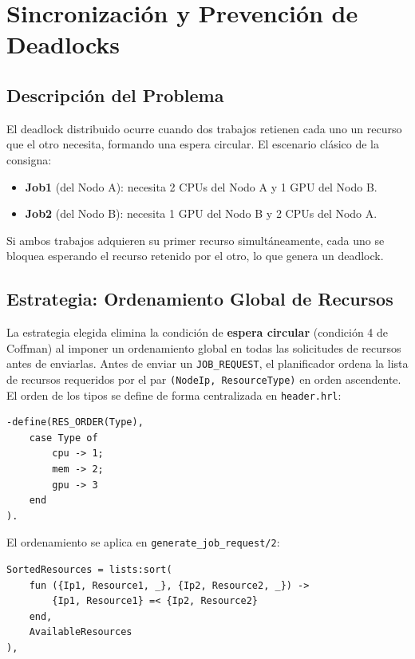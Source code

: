 \documentclass[12pt,a4paper]{article}
\begin{document}
\section{Sincronización y Prevención de Deadlocks}

\subsection{Descripción del Problema}

El deadlock distribuido ocurre cuando dos trabajos retienen cada uno un recurso que el otro necesita, formando una espera circular. El escenario clásico de la consigna:

\begin{itemize}
  \item \textbf{Job1} (del Nodo A): necesita 2 CPUs del Nodo A y 1 GPU del Nodo B.
  \item \textbf{Job2} (del Nodo B): necesita 1 GPU del Nodo B y 2 CPUs del Nodo A.
\end{itemize}

Si ambos trabajos adquieren su primer recurso simultáneamente, cada uno se bloquea esperando el recurso retenido por el otro, lo que genera un deadlock.

\subsection{Estrategia: Ordenamiento Global de Recursos}

La estrategia elegida elimina la condición de \textbf{espera circular} (condición 4 de Coffman) al imponer un ordenamiento global en todas las solicitudes de recursos antes de enviarlas. Antes de enviar un \texttt{JOB\_REQUEST}, el planificador ordena la lista de recursos requeridos por el par \texttt{(NodeIp, ResourceType)} en orden ascendente. El orden de los tipos se define de forma centralizada en \texttt{header.hrl}:

\begin{lstlisting}
-define(RES_ORDER(Type),
    case Type of
        cpu -> 1;
        mem -> 2;
        gpu -> 3
    end
).
\end{lstlisting}

El ordenamiento se aplica en \texttt{generate\_job\_request/2}:

\begin{lstlisting}
SortedResources = lists:sort(
    fun ({Ip1, Resource1, _}, {Ip2, Resource2, _}) ->
        {Ip1, Resource1} =< {Ip2, Resource2}
    end,
    AvailableResources
),
\end{lstlisting}
\end{document}
